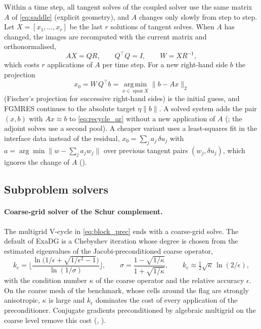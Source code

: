 \documentclass[11pt,a4paper]{article}
\theoremstyle{definition}
\theoremstyle{remark}
\begin{document}
Within a time step, all tangent solves of the coupled solver use the same matrix $A$ of
\eqref{eq:saddle} (explicit geometry), and $A$ changes only slowly from step to step. Let
$X=[x_1,\dots,x_r]$ be the last $r$ solutions of tangent solves. When $A$ has changed, the images
are recomputed with the current matrix and orthonormalised,
\begin{equation}\label{eq:recycle_qr}
  AX=QR,\qquad Q^{\top}Q=I,\qquad W=XR^{-1},
\end{equation}
which costs $r$ applications of $A$ per time step. For a new right-hand side $b$ the projection
\begin{equation}\label{eq:fischer}
  x_0=W\,Q^{\top}b=\operatorname*{arg\,min}_{x\in\operatorname{span}X}\|b-Ax\|_2
\end{equation}
(Fischer's projection for successive right-hand sides) is the initial guess, and FGMRES continues
to the absolute target $\eta\|b\|$. A solved system adds the pair $(x,b)$ with $Ax\approx b$ to
\eqref{eq:recycle_qr} without a new application of $A$ (; the adjoint
solves use a second pool). A cheaper variant uses a least-squares fit in the interface data
instead of the residual, $x_0=\sum_ja_j\,\delta u_j$ with
$a=\arg\min\|w-\sum_ja_jw_j\|$ over previous tangent pairs $(w_j,\delta u_j)$, which ignores the
change of $A$ ().

\subsection{Subproblem solvers}\label{sec:subsolvers}

\paragraph{Coarse-grid solver of the Schur complement.} The multigrid V-cycle in
\eqref{eq:block_prec} ends with a coarse-grid solve. The default of ExaDG is a Chebyshev iteration
whose degree is chosen from the estimated eigenvalues of the Jacobi-preconditioned coarse operator,
\begin{equation}\label{eq:chebyshev_degree}
  k_{\mathrm c}=\bigg\lfloor\frac{\ln\big(1/\epsilon+\sqrt{1/\epsilon^2-1}\big)}{\ln(1/\sigma)}\bigg\rfloor,
  \qquad \sigma=\frac{1-\sqrt{1/\kappa}}{1+\sqrt{1/\kappa}},\qquad
  k_{\mathrm c}\approx\tfrac12\sqrt\kappa\,\ln(2/\epsilon),
\end{equation}
with the condition number $\kappa$ of the coarse operator and the relative accuracy $\epsilon$. On
the coarse mesh of the benchmark, whose cells around the flag are strongly anisotropic, $\kappa$ is
large and $k_{\mathrm c}$ dominates the cost of every application of the preconditioner. Conjugate
gradients preconditioned by algebraic multigrid on the coarse level remove this cost
(, ).
\end{document}
